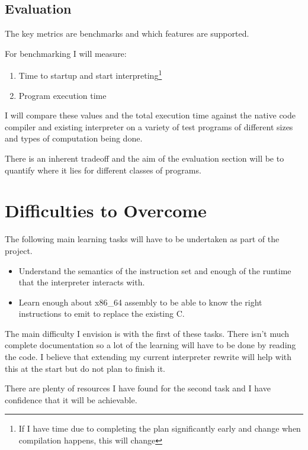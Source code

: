 \documentclass[12pt,a4paper, headings=standardclasses]{scrartcl}
\begin{document}
\subsection*{Evaluation}

The key metrics are benchmarks and which features are supported.

For benchmarking I will measure:

\begin{enumerate}
    \item Time to startup and start interpreting\footnote{If I have time due to completing the plan significantly early and change when compilation happens, this will change}
    \item Program execution time
\end{enumerate}

I will compare these values and the total execution time against the native
code compiler and existing interpreter on a variety of test programs of
different sizes and types of computation being done.

There is an inherent tradeoff and the aim of the evaluation section will be
to quantify where it lies for different classes of programs.

\section*{Difficulties to Overcome}

The following main learning tasks will have to be undertaken as part of the
project.

\begin{itemize}

    \item Understand the semantics of the instruction set and enough of the
          runtime that the interpreter interacts with.
    \item Learn enough about x86\_64 assembly to be able to know the right
          instructions to emit to replace the existing C.
\end{itemize}

The main difficulty I envision is with the first of these tasks. There isn't
much complete documentation so a lot of the learning will have to be done by
reading the code. I believe that extending my current interpreter rewrite will
help with this at the start but do not plan to finish it.

There are plenty of resources I have found for the second task and I have
confidence that it will be achievable.
\end{document}
